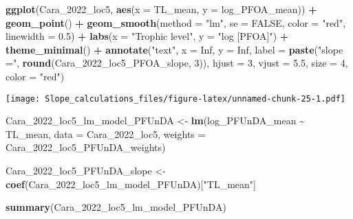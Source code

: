 \documentclass[
]{article}
\newenvironment{Shaded}{\begin{snugshade}}{\end{snugshade}}
\newcommand{\AttributeTok}[1]{\textcolor[rgb]{0.13,0.29,0.53}{#1}}
\newcommand{\ConstantTok}[1]{\textcolor[rgb]{0.56,0.35,0.01}{#1}}
\newcommand{\DecValTok}[1]{\textcolor[rgb]{0.00,0.00,0.81}{#1}}
\newcommand{\FloatTok}[1]{\textcolor[rgb]{0.00,0.00,0.81}{#1}}
\newcommand{\FunctionTok}[1]{\textcolor[rgb]{0.13,0.29,0.53}{\textbf{#1}}}
\newcommand{\NormalTok}[1]{#1}
\newcommand{\OtherTok}[1]{\textcolor[rgb]{0.56,0.35,0.01}{#1}}
\newcommand{\SpecialCharTok}[1]{\textcolor[rgb]{0.81,0.36,0.00}{\textbf{#1}}}
\newcommand{\StringTok}[1]{\textcolor[rgb]{0.31,0.60,0.02}{#1}}
\begin{document}
\begin{Shaded}
\begin{Highlighting}[]
\FunctionTok{ggplot}\NormalTok{(Cara\_2022\_loc5, }\FunctionTok{aes}\NormalTok{(}\AttributeTok{x =}\NormalTok{ TL\_mean, }\AttributeTok{y =}\NormalTok{ log\_PFOA\_mean)) }\SpecialCharTok{+}
  \FunctionTok{geom\_point}\NormalTok{() }\SpecialCharTok{+}
  \FunctionTok{geom\_smooth}\NormalTok{(}\AttributeTok{method =} \StringTok{"lm"}\NormalTok{, }\AttributeTok{se =} \ConstantTok{FALSE}\NormalTok{, }\AttributeTok{color =} \StringTok{"red"}\NormalTok{, }\AttributeTok{linewidth =} \FloatTok{0.5}\NormalTok{) }\SpecialCharTok{+}
  \FunctionTok{labs}\NormalTok{(}\AttributeTok{x =} \StringTok{"Trophic level"}\NormalTok{,}
       \AttributeTok{y =} \StringTok{"log [PFOA]"}\NormalTok{) }\SpecialCharTok{+}
  \FunctionTok{theme\_minimal}\NormalTok{() }\SpecialCharTok{+}
  \FunctionTok{annotate}\NormalTok{(}\StringTok{"text"}\NormalTok{, }\AttributeTok{x =} \ConstantTok{Inf}\NormalTok{, }\AttributeTok{y =} \ConstantTok{Inf}\NormalTok{, }\AttributeTok{label =} \FunctionTok{paste}\NormalTok{(}\StringTok{"slope ="}\NormalTok{, }\FunctionTok{round}\NormalTok{(Cara\_2022\_loc5\_PFOA\_slope, }\DecValTok{3}\NormalTok{)), }
           \AttributeTok{hjust =} \DecValTok{3}\NormalTok{, }\AttributeTok{vjust =} \FloatTok{5.5}\NormalTok{, }\AttributeTok{size =} \DecValTok{4}\NormalTok{, }\AttributeTok{color =} \StringTok{"red"}\NormalTok{)}
\end{Highlighting}
\end{Shaded}

\texttt{[image: Slope\_calculations\_files/figure-latex/unnamed-chunk-25-1.pdf]}

\begin{Shaded}
\begin{Highlighting}[]
\NormalTok{Cara\_2022\_loc5\_lm\_model\_PFUnDA }\OtherTok{\textless{}{-}} \FunctionTok{lm}\NormalTok{(log\_PFUnDA\_mean }\SpecialCharTok{\textasciitilde{}}\NormalTok{ TL\_mean, }
                                     \AttributeTok{data =}\NormalTok{ Cara\_2022\_loc5, }
                                     \AttributeTok{weights =}\NormalTok{ Cara\_2022\_loc5\_PFUnDA\_weights)}

\NormalTok{Cara\_2022\_loc5\_PFUnDA\_slope }\OtherTok{\textless{}{-}} \FunctionTok{coef}\NormalTok{(Cara\_2022\_loc5\_lm\_model\_PFUnDA)[}\StringTok{"TL\_mean"}\NormalTok{]}

\FunctionTok{summary}\NormalTok{(Cara\_2022\_loc5\_lm\_model\_PFUnDA)}
\end{Highlighting}
\end{Shaded}
\end{document}
